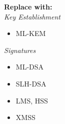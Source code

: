 \documentclass[
aspectratio=169, %
t, %
onlytextwidth, %
10pt, %
]{beamer}
\begin{document}
\begin{frame}
\begin{columns}
\begin{column}{0.58\linewidth}
\begin{table}[]
\begin{tabular}{|l|l|l|}
                    \hline
                \end{tabular}
            \end{table}
        \end{column}
        \begin{column}{0.32\linewidth} %
            \newline
            \textbf{Replace with:}\\
            \textit{Key Establishment}
            \vspace{-1em}
            \begin{itemize}
                \item ML-KEM
            \end{itemize}
            \textit{Signatures}
            \vspace{-1em}
            \begin{itemize}
                \item ML-DSA
                \item SLH-DSA
                \item LMS, HSS
                \item XMSS
            \end{itemize}
        \end{column}
    \end{columns}
\end{frame}

\end{document}
